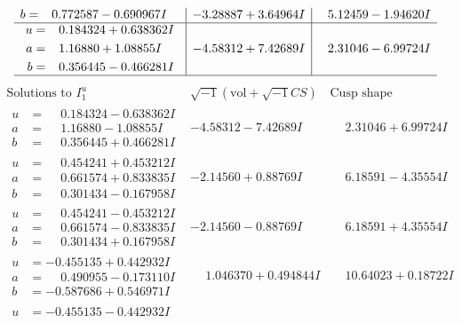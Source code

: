 \documentclass[1p]{elsarticle_modified}
\theoremstyle{definition}
\newcommand{\I}{\sqrt{-1}}
\begin{document}
$$\begin{array}{c|c|c}
\begin{aligned}
b &= \phantom{-}0.772587 - 0.690967 I\end{aligned}
 & -3.28887 + 3.64964 I & \phantom{-}5.12459 - 1.94620 I \\ \hline\begin{aligned}
u &= \phantom{-}0.184324 + 0.638362 I \\
a &= \phantom{-}1.16880 + 1.08855 I \\
b &= \phantom{-}0.356445 - 0.466281 I\end{aligned}
 & -4.58312 + 7.42689 I & \phantom{-}2.31046 - 6.99724 I\\
 \hline 
 \end{array}$$\newpage$$\begin{array}{c|c|c}  
\text{Solutions to }I^u_{1}& \I (\text{vol} + \sqrt{-1}CS) & \text{Cusp shape}\\
 \hline 
\begin{aligned}
u &= \phantom{-}0.184324 - 0.638362 I \\
a &= \phantom{-}1.16880 - 1.08855 I \\
b &= \phantom{-}0.356445 + 0.466281 I\end{aligned}
 & -4.58312 - 7.42689 I & \phantom{-}2.31046 + 6.99724 I \\ \hline\begin{aligned}
u &= \phantom{-}0.454241 + 0.453212 I \\
a &= \phantom{-}0.661574 + 0.833835 I \\
b &= \phantom{-}0.301434 - 0.167958 I\end{aligned}
 & -2.14560 + 0.88769 I & \phantom{-}6.18591 - 4.35554 I \\ \hline\begin{aligned}
u &= \phantom{-}0.454241 - 0.453212 I \\
a &= \phantom{-}0.661574 - 0.833835 I \\
b &= \phantom{-}0.301434 + 0.167958 I\end{aligned}
 & -2.14560 - 0.88769 I & \phantom{-}6.18591 + 4.35554 I \\ \hline\begin{aligned}
u &= -0.455135 + 0.442932 I \\
a &= \phantom{-}0.490955 - 0.173110 I \\
b &= -0.587686 + 0.546971 I\end{aligned}
 & \phantom{-}1.046370 + 0.494844 I & \phantom{-}10.64023 + 0.18722 I \\ \hline\begin{aligned}
u &= -0.455135 - 0.442932 I \\

\end{aligned}
\end{array}$$
\end{document}
